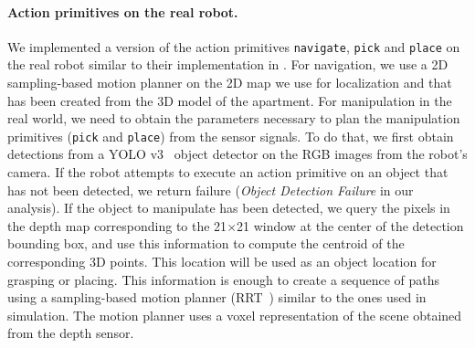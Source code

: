 \paragraph{Action primitives on the real robot.} We implemented a version of the action primitives \texttt{navigate}, \texttt{pick} and \texttt{place} on the real robot similar to their implementation in \simulator. For navigation, we use a 2D sampling-based motion planner on the 2D map we use for localization and that has been created from the 3D model of the apartment. For manipulation in the real world, we need to obtain the parameters necessary to plan the manipulation primitives (\texttt{pick} and \texttt{place}) from the sensor signals. To do that, we first obtain detections from a YOLO v3~\cite{redmon2018yolov3} object detector on the RGB images from the robot's camera. If the robot attempts to execute an action primitive on an object that has not been detected, we return failure (\textit{Object Detection Failure} in our analysis). If the object to manipulate has been detected, we query the pixels in the depth map corresponding to the 21$\times$21 window at the center of the detection bounding box, and use this information to compute the centroid of the corresponding 3D points. This location will be used as an object location for grasping or placing. This information is enough to create a sequence of paths using a sampling-based motion planner (RRT~\cite{kuffner2000rrt}) similar to the ones used in simulation. The motion planner uses a voxel representation of the scene obtained from the depth sensor.

